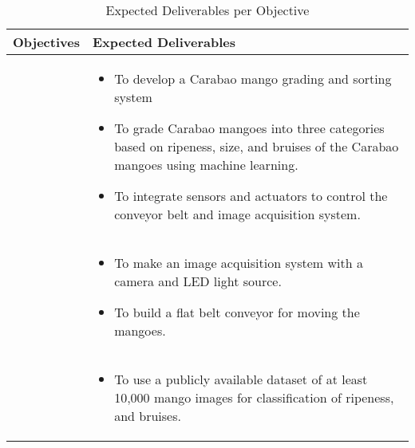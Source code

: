 \begin{table}[!htbp]
	\caption{Expected Deliverables per Objective} 	
	\label{tab:expd1} 
	{\centering \scriptsize
		\begin{tabular}{p{}|p{}}
			\hline 
			\hline 
			\textbf{Objectives} & 
			\textbf{Expected Deliverables}\\ 
			\hline 
			\Paste{GO} &
			\begin{minipage}{0.55\textwidth}
				\vspace{10pt} 
				\begin{itemize}
					\item To develop a Carabao mango grading and sorting system 
					\item To grade Carabao mangoes into three categories based on ripeness, size, and 
					bruises of the Carabao mangoes using machine learning.
					\item To integrate sensors and actuators to control the conveyor belt and image acquisition system.
				\end{itemize}
			\end{minipage} \\ \hline
			
			\Paste{SO1} & 
			\begin{minipage}{0.55\textwidth}
				\vspace{10pt}
				\begin{itemize}
					\item To make an image acquisition system with a camera and LED light source.
					\item To build a flat belt conveyor for moving the mangoes.
				\end{itemize}
			\end{minipage} \\ \hline
			
			\Paste{SO2} & 
			\begin{minipage}{0.55\textwidth}
				\vspace{10pt}
				\begin{itemize}
					\item To use a publicly available dataset of at least 10,000 mango images
					for classification of ripeness, and bruises.
				\end{itemize}
			\end{minipage} \\ \hline
			

\end{tabular}}
\end{table}

